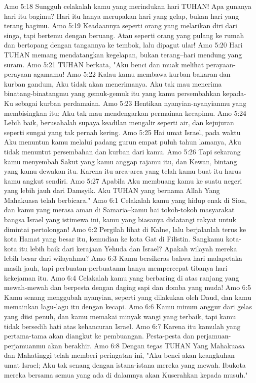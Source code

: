 Amo 5:18  Sungguh celakalah kamu yang merindukan hari TUHAN! Apa gunanya hari itu bagimu? Hari itu hanya merupakan hari yang gelap, bukan hari yang terang bagimu.
Amo 5:19  Keadaannya seperti orang yang melarikan diri dari singa, tapi bertemu dengan beruang. Atau seperti orang yang pulang ke rumah dan bertopang dengan tangannya ke tembok, lalu dipagut ular!
Amo 5:20  Hari TUHAN memang mendatangkan kegelapan, bukan terang--hari mendung yang suram.
Amo 5:21  TUHAN berkata, "Aku benci dan muak melihat perayaan-perayaan agamamu!
Amo 5:22  Kalau kamu membawa kurban bakaran dan kurban gandum, Aku tidak akan menerimanya. Aku tak mau menerima binatang-binatangmu yang gemuk-gemuk itu yang kamu persembahkan kepada-Ku sebagai kurban perdamaian.
Amo 5:23  Hentikan nyanyian-nyanyianmu yang membisingkan itu; Aku tak mau mendengarkan permainan kecapimu.
Amo 5:24  Lebih baik, berusahalah supaya keadilan mengalir seperti air, dan kejujuran seperti sungai yang tak pernah kering.
Amo 5:25  Hai umat Israel, pada waktu Aku menuntun kamu melalui padang gurun empat puluh tahun lamanya, Aku tidak menuntut persembahan dan kurban dari kamu.
Amo 5:26  Tapi sekarang kamu menyembah Sakut yang kamu anggap rajamu itu, dan Kewan, bintang yang kamu dewakan itu. Karena itu arca-arca yang telah kamu buat itu harus kamu angkut sendiri.
Amo 5:27  Apabila Aku membuang kamu ke suatu negeri yang lebih jauh dari Damsyik. Aku TUHAN yang bernama Allah Yang Mahakuasa telah berbicara."
Amo 6:1  Celakalah kamu yang hidup enak di Sion, dan kamu yang merasa aman di Samaria--kamu hai tokoh-tokoh masyarakat bangsa Israel yang istimewa ini, kamu yang biasanya didatangi rakyat untuk dimintai pertolongan!
Amo 6:2  Pergilah lihat di Kalne, lalu berjalanlah terus ke kota Hamat yang besar itu, kemudian ke kota Gat di Filistin. Sangkamu kota-kota itu lebih baik dari kerajaan Yehuda dan Israel? Apakah wilayah mereka lebih besar dari wilayahmu?
Amo 6:3  Kamu bersikeras bahwa hari malapetaka masih jauh, tapi perbuatan-perbuatanm hanya mempercepat tibanya hari kekejaman itu.
Amo 6:4  Celakalah kamu yang berbaring di atas ranjang yang mewah-mewah dan berpesta dengan daging sapi dan domba yang muda!
Amo 6:5  Kamu senang menggubah nyanyian, seperti yang dilakukan oleh Daud, dan kamu memainkan lagu-lagu itu dengan kecapi.
Amo 6:6  Kamu minum anggur dari gelas yang diisi penuh, dan kamu memakai minyak wangi yang terbaik, tapi kamu tidak bersedih hati atas kehancuran Israel.
Amo 6:7  Karena itu kamulah yang pertama-tama akan diangkut ke pembuangan. Pesta-pesta dan perjamuan-perjamuanmu akan berakhir.
Amo 6:8  Dengan tegas TUHAN Yang Mahakuasa dan Mahatinggi telah memberi peringatan ini, "Aku benci akan keangkuhan umat Israel; Aku tak senang dengan istana-istana mereka yang mewah. Ibukota mereka bersama semua yang ada di dalamnya akan Kuserahkan kepada musuh."

